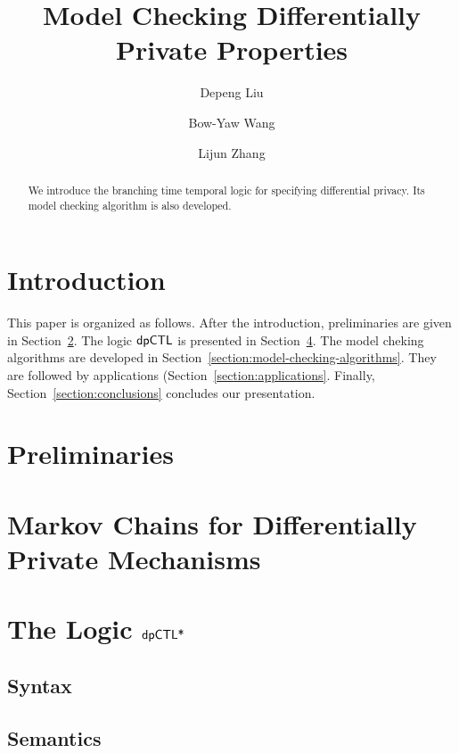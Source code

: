 \documentclass{llncs}
\title{Model Checking Differentially Private Properties}
\author{
Depeng Liu\inst{1}
\and
Bow-Yaw Wang\inst{2}
\and
Lijun Zhang\inst{1}}
\institute{
Chinese Academy of Sciences
\and
Academia Sinica
}
\begin{document}
\maketitle

\begin{abstract}
  We introduce the branching time temporal logic \dpCTL for specifying
  differential privacy. Its model checking algorithm is also developed.
\end{abstract}

\section{Introduction}
\label{section:introduction}


This paper is organized as follows. After the introduction,
preliminaries are given in Section~\ref{section:preliminaries}. The
logic $\textsf{dpCTL}$ is presented in
Section~\ref{section:dpCTL}. The model cheking algorithms are developed in
Section~\ref{section:model-checking-algorithms}. They are followed by
applications (Section~\ref{section:applications}. Finally,
Section~\ref{section:conclusions} concludes our presentation.

\section{Preliminaries}
\label{section:preliminaries}


\section{Markov Chains  for Differentially Private Mechanisms}
\label{section:examples}


\section{The Logic $\textsf{dpCTL*}$}
\label{section:dpCTL}


\subsection{Syntax}
\label{subsection:syntax}


\subsection{Semantics}
\label{subsection:semantics}

\end{document}
